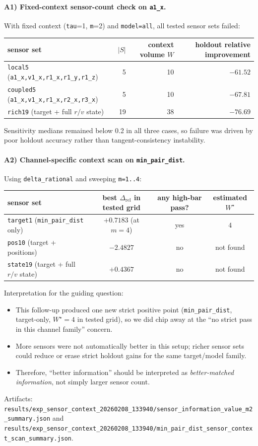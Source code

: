 \documentclass[11pt]{article}
\begin{document}
\paragraph{A1) Fixed-context sensor-count check on \texttt{a1\_x}.}
With fixed context (\texttt{tau}=1, \texttt{m}=2) and \texttt{model=all}, all tested sensor sets failed:
\begin{center}
\begin{tabular}{lrrr}
\hline
sensor set & $|S|$ & context volume $W$ & holdout relative improvement \\
\hline
\texttt{local5} (\texttt{a1\_x,v1\_x,r1\_x,r1\_y,r1\_z}) & 5 & 10 & $-61.52$ \\
\texttt{coupled5} (\texttt{a1\_x,v1\_x,r1\_x,r2\_x,r3\_x}) & 5 & 10 & $-67.81$ \\
\texttt{rich19} (target + full $r/v$ state) & 19 & 38 & $-76.69$ \\
\hline
\end{tabular}
\end{center}
Sensitivity medians remained below 0.2 in all three cases, so failure was driven by poor holdout accuracy rather than tangent-consistency instability.

\paragraph{A2) Channel-specific context scan on \texttt{min\_pair\_dist}.}
Using \texttt{delta\_rational} and sweeping \texttt{m=1..4}:
\begin{center}
\begin{tabular}{lccc}
\hline
sensor set & best $\Delta_{\mathrm{rel}}$ in tested grid & any high-bar pass? & estimated $W^\star$ \\
\hline
\texttt{target1} (\texttt{min\_pair\_dist} only) & $+0.7183$ (at $m=4$) & yes & $4$ \\
\texttt{pos10} (target + positions) & $-2.4827$ & no & not found \\
\texttt{state19} (target + full $r/v$ state) & $+0.4367$ & no & not found \\
\hline
\end{tabular}
\end{center}

Interpretation for the guiding question:
\begin{itemize}
\item This follow-up produced one new strict positive point (\texttt{min\_pair\_dist}, target-only, $W^\star=4$ in tested grid), so we did chip away at the ``no strict pass in this channel family'' concern.
\item More sensors were not automatically better in this setup; richer sensor sets could reduce or erase strict holdout gains for the same target/model family.
\item Therefore, ``better information'' should be interpreted as \emph{better-matched information}, not simply larger sensor count.
\end{itemize}
Artifacts: \texttt{results/exp\_sensor\_context\_20260208\_133940/sensor\_information\_value\_m2\_summary.json} and \texttt{results/exp\_sensor\_context\_20260208\_133940/min\_pair\_dist\_sensor\_context\_scan\_summary.json}.
\end{document}
